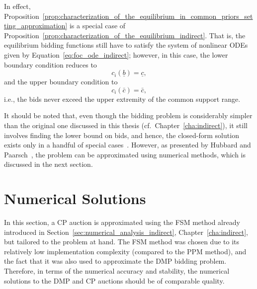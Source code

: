 In effect, Proposition~\ref{prop:characterization_of_the_equilibrium_in_common_priors_setting_approximation} is a special case of Proposition~\ref{prop:characterization_of_the_equilibrium_indirect}. That is, the equilibrium bidding functions still have to satisfy the system of nonlinear ODEs given by Equation~\eqref{eq:foc_ode_indirect}; however, in this case, the lower boundary condition reduces to
\begin{equation*}
  c_i(\underline{b}) = \underline{c},
\end{equation*}
and the upper boundary condition to
\begin{equation*}
  c_i(\bar{c}) = \bar{c},
\end{equation*}
i.e., the bids never exceed the upper extremity of the common support range.

It should be noted that, even though the bidding problem is considerably simpler than the original one discussed in this thesis (cf.~Chapter~\ref{cha:indirect}), it still involves finding the lower bound on bids, and hence, the closed-form solution exists only in a handful of special cases~\cite{Krishna10,HubbardPaarsch2011}. However, as presented by Hubbard and Paarsch~\cite{HubbardPaarsch2011}, the problem can be approximated using numerical methods, which is discussed in the next section.

\section{Numerical Solutions} %
\label{sec:numerical_solutions}
In this section, a CP auction is approximated using the FSM method already introduced in Section~\ref{sec:numerical_analysis_indirect}, Chapter~\ref{cha:indirect}, but tailored to the problem at hand. The FSM method was chosen due to its relatively low implementation complexity (compared to the PPM method), and the fact that it was also used to approximate the DMP bidding problem. Therefore, in terms of the numerical accuracy and stability, the numerical solutions to the DMP and CP auctions should be of comparable quality.

